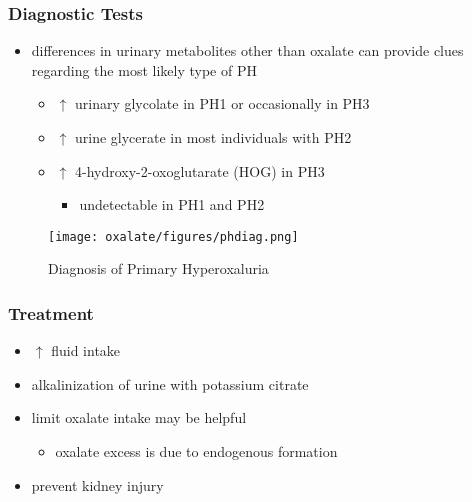 \documentclass[12pt]{scrartcl}
\begin{document}
\subsubsection{Diagnostic Tests}
\label{sec:org67e37d9}
\begin{itemize}
\item differences in urinary metabolites other than oxalate can provide
clues regarding the most likely type of PH

\begin{itemize}
\item \(\uparrow\) urinary glycolate in PH1 or occasionally in PH3
\item \(\uparrow\) urine glycerate in most individuals with PH2
\item \(\uparrow\) 4-hydroxy-2-oxoglutarate (HOG) in PH3
\begin{itemize}
\item undetectable in PH1 and PH2
\end{itemize}
\end{itemize}
\end{itemize}

\begin{figure}[htbp]
\centering
\texttt{[image: oxalate/figures/phdiag.png]}
\caption{\label{fig:org76e7c9b}Diagnosis of Primary Hyperoxaluria}
\end{figure}

\subsubsection{Treatment}
\label{sec:org5e3c300}
\begin{itemize}
\item \(\uparrow\) fluid intake
\item alkalinization of urine with potassium citrate
\item limit oxalate intake may be helpful
\begin{itemize}
\item oxalate excess is due to endogenous formation
\end{itemize}
\item prevent kidney injury
\end{itemize}
\end{document}
